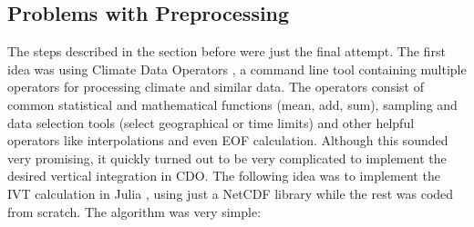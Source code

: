 %
%
%
%
%
%
%
%
%
%   
%
\subsection{Problems with Preprocessing}
\label{sec:preprocessing_problems}

The steps described in the section before were just the final attempt. 
The first idea was using Climate Data Operators \cite{schulzweida2024}, a command line tool containing multiple operators for processing climate and similar data. 
The operators consist of common statistical and mathematical functions (mean, add, sum), sampling and data selection tools (select geographical or time limits) and other helpful operators like interpolations and even EOF calculation. 
Although this sounded very promising, it quickly turned out to be very complicated to implement the desired vertical integration in CDO.
The following idea was to implement the IVT calculation in Julia \cite{gao_julia_2020}, using just a NetCDF library \cite{barth_ncdatasetsjl_2024} while the rest was coded from scratch. 
The algorithm was very simple: 


